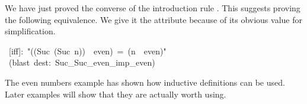 We have just proved the converse of the introduction rule . 
This suggests proving the following equivalence.  We give it the 
attribute because of its obvious value for simplification.
\begin{isabelle}
\ [iff]:\ "((Suc\ (Suc\ n))\ \isasymin \ even)\ =\ (n\
\isasymin \ even)"\isanewline
{}\ (blast\ dest:\ Suc_Suc_even_imp_even)\isanewline
\isacommand{done}
\end{isabelle}

The even numbers example has shown how inductive definitions can be used. 
Later examples will show that they are actually worth using.
